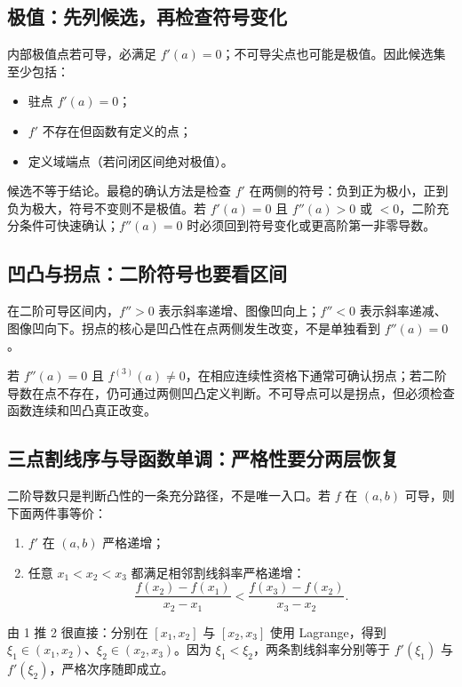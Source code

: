 \documentclass[UTF8,fontset=none,11pt,a4paper]{ctexart}
\begin{document}
\subsection{极值：先列候选，再检查符号变化}

内部极值点若可导，必满足 $f'(a)=0$；不可导尖点也可能是极值。因此候选集至少包括：
\begin{itemize}
  \item 驻点 $f'(a)=0$；
  \item $f'$ 不存在但函数有定义的点；
  \item 定义域端点（若问闭区间绝对极值）。
\end{itemize}

候选不等于结论。最稳的确认方法是检查 $f'$ 在两侧的符号：负到正为极小，正到负为极大，符号不变则不是极值。若 $f'(a)=0$ 且 $f''(a)>0$ 或 $<0$，二阶充分条件可快速确认；$f''(a)=0$ 时必须回到符号变化或更高阶第一非零导数。

\subsection{凹凸与拐点：二阶符号也要看区间}

在二阶可导区间内，$f''>0$ 表示斜率递增、图像凹向上；$f''<0$ 表示斜率递减、图像凹向下。拐点的核心是凹凸性在点两侧发生改变，不是单独看到 $f''(a)=0$。

若 $f''(a)=0$ 且 $f^{(3)}(a)\ne0$，在相应连续性资格下通常可确认拐点；若二阶导数在点不存在，仍可通过两侧凹凸定义判断。不可导点可以是拐点，但必须检查函数连续和凹凸真正改变。

\subsection{三点割线序与导函数单调：严格性要分两层恢复}

二阶导数只是判断凸性的一条充分路径，不是唯一入口。若 $f$ 在 $(a,b)$ 可导，则下面两件事等价：
\begin{enumerate}
  \item $f'$ 在 $(a,b)$ 严格递增；
  \item 任意 $x_1<x_2<x_3$ 都满足相邻割线斜率严格递增：
  \[
  \frac{f(x_2)-f(x_1)}{x_2-x_1}
  <
  \frac{f(x_3)-f(x_2)}{x_3-x_2}.
  \]
\end{enumerate}

由 1 推 2 很直接：分别在 $[x_1,x_2]$ 与 $[x_2,x_3]$ 使用 Lagrange，得到
$\xi_1\in(x_1,x_2)$、$\xi_2\in(x_2,x_3)$。因为 $\xi_1<\xi_2$，两条割线斜率分别等于
$f'(\xi_1)$ 与 $f'(\xi_2)$，严格次序随即成立。
\end{document}
